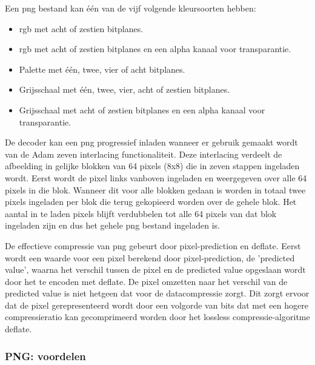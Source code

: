 Een \gls{png} bestand kan één van de vijf volgende kleursoorten hebben:

\begin{itemize}
	\item \Gls{rgb} met acht of zestien \glspl{bitplane}.
	
	\item \Gls{rgb} met acht of zestien \glspl{bitplane} en een alpha kanaal voor transparantie.
	
	\item Palette met één, twee, vier of acht \glspl{bitplane}.
	
	\item Grijsschaal met één, twee, vier, acht of zestien \glspl{bitplane}.
	
	\item Grijsschaal met acht of zestien \glspl{bitplane} en een alpha kanaal voor transparantie.
	
\end{itemize}
 

De \gls{decoder} kan een \gls{png} progressief inladen wanneer er gebruik gemaakt wordt van de Adam zeven interlacing functionaliteit. Deze interlacing verdeelt de afbeelding in gelijke blokken van 64 pixels (8x8) die in zeven stappen ingeladen wordt. Eerst wordt de pixel links vanboven ingeladen en weergegeven over alle 64 pixels in die blok. Wanneer dit voor alle blokken gedaan is worden in totaal twee pixels ingeladen per blok die terug gekopieerd worden over de gehele blok. Het aantal in te laden pixels blijft verdubbelen tot alle 64 pixels van dat blok ingeladen zijn en dus het gehele \gls{png} bestand ingeladen is.

De effectieve compressie van \gls{png} gebeurt door \gls{pixel-prediction} en \gls{deflate}. Eerst wordt een waarde voor een pixel berekend door \gls{pixel-prediction}, de 'predicted value', waarna het verschil tussen de pixel en de predicted value opgeslaan wordt door het te encoden met \gls{deflate}. De pixel omzetten naar het verschil van de predicted value is niet hetgeen dat voor de \gls{datacompressie} zorgt. Dit zorgt ervoor dat de pixel gerepresenteerd wordt door een volgorde van \glspl{bit} dat met een hogere compressieratio kan gecomprimeerd worden door het \gls{lossless} \gls{compressie-algoritme} \gls{deflate}.

\subsubsection{PNG: voordelen}
\label{sec:afbeeldingscompressie-png-voordelen}

